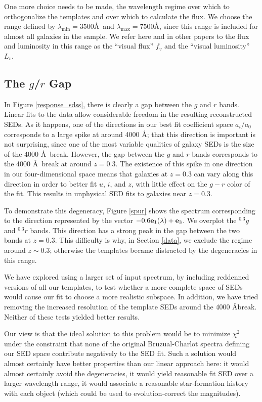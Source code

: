 \documentclass[10pt,preprint]{aastex}
\newcommand{\vv}[1]{{\bf #1}}
\newcommand{\band}[2]{\ensuremath{^{#1}\!{#2}}}
\begin{document}
One more choice needs to be made, the wavelength regime over which to
orthogonalize the templates and over which to calculate the flux. We
choose the range defined by $\lambda_{\mathrm{min}}=3500$\AA\ and
$\lambda_{\mathrm{max}}=7500$\AA, since this range is included for
almost all galaxies in the sample. We refer here and in other papers
to the flux and luminosity in this range as the ``visual flux'' $f_v$
and the ``visual luminosity'' $L_v$.

\subsection{The $g$/$r$ Gap}
\label{grgap}

In Figure \ref{response_sdss}, there is clearly a gap between the $g$
and $r$ bands. Linear fits to the data allow considerable freedom in
the resulting reconstructed SEDs. As it happens, one of the directions
in our best fit coefficient space $a_i/a_0$ corresponds to a large
spike at around 4000 \AA; that this direction is important is not
surprising, since one of the most variable qualities of galaxy SEDs is
the size of the 4000 \AA\ break. However, the gap between the $g$ and
$r$ bands corresponds to the 4000 \AA\ break at around $z=0.3$. The
existence of this spike in one direction in our four-dimensional space
means that galaxies at $z=0.3$ can vary along this direction in order
to better fit $u$, $i$, and $z$, with little effect on the $g-r$ color
of the fit. This results in unphysical SED fits to galaxies near
$z=0.3$. 

To demonstrate this degeneracy, Figure \ref{spur} shows the spectrum
corresponding to the direction represented by the vector $-0.6
\vv{e}_1(\lambda) + \vv{e}_3$. We overplot the \band{0.3}{g} and
\band{0.3}{r} bands. This direction has a strong peak in the gap
between the two bands at $z=0.3$.  This difficulty is why, in Section
\ref{data}, we exclude the regime around $z\sim 0.3$; otherwise the
templates became distracted by the degeneracies in this range.

We have explored using a larger set of input spectrum, by including
reddenned versions of all our templates, to test whether a more
complete space of SEDs would cause our fit to choose a more realistic
subspace. In addition, we have tried removing the increased resolution
of the template SEDs around the 4000 \AA break. Neither of these tests
yielded better results. 

Our view is that the ideal solution to this problem would be to
minimize $\chi^2$ under the constraint that none of the original
Bruzual-Charlot spectra defining our SED space contribute negatively
to the SED fit. Such a solution would almost certainly have better
properties than our linear approach here: it would almost certainly
avoid the degeneracies, it would yield reasonable fit SED over a
larger wavelength range, it would associate a reasonable
star-formation history with each object (which could be used to
evolution-correct the magnitudes).
\end{document}
